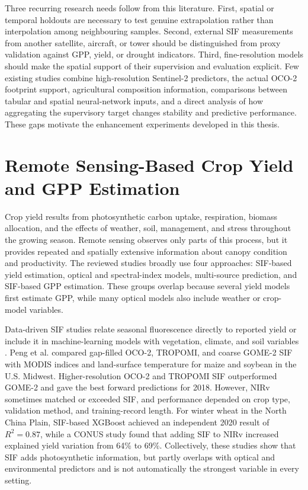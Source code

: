 Three recurring research needs follow from this literature. First, spatial or temporal holdouts are necessary to test genuine extrapolation rather than interpolation among neighbouring samples. Second, external SIF measurements from another satellite, aircraft, or tower should be distinguished from proxy validation against GPP, yield, or drought indicators. Third, fine-resolution models should make the spatial support of their supervision and evaluation explicit. Few existing studies combine high-resolution Sentinel-2 predictors, the actual OCO-2 footprint support, agricultural composition information, comparisons between tabular and spatial neural-network inputs, and a direct analysis of how aggregating the supervisory target changes stability and predictive performance. These gaps motivate the enhancement experiments developed in this thesis.

\section{Remote Sensing-Based Crop Yield and GPP Estimation}
\label{sec:crop_yield_gpp}

Crop yield results from photosynthetic carbon uptake, respiration, biomass allocation, and the effects of weather, soil, management, and stress throughout the growing season. Remote sensing observes only parts of this process, but it provides repeated and spatially extensive information about canopy condition and productivity. The reviewed studies broadly use four approaches: SIF-based yield estimation, optical and spectral-index models, multi-source prediction, and SIF-based GPP estimation. These groups overlap because several yield models first estimate GPP, while many optical models also include weather or crop-model variables.

Data-driven SIF studies relate seasonal fluorescence directly to reported yield or include it in machine-learning models with vegetation, climate, and soil variables \cite{peng2020assessing}\cite{zheng2025modeling}\cite{joshi2023winter}. Peng et al. compared gap-filled OCO-2, TROPOMI, and coarse GOME-2 SIF with MODIS indices and land-surface temperature for maize and soybean in the U.S. Midwest. Higher-resolution OCO-2 and TROPOMI SIF outperformed GOME-2 and gave the best forward predictions for 2018. However, NIRv sometimes matched or exceeded SIF, and performance depended on crop type, validation method, and training-record length. For winter wheat in the North China Plain, SIF-based XGBoost achieved an independent 2020 result of $R^2=0.87$, while a CONUS study found that adding SIF to NIRv increased explained yield variation from 64\% to 69\%. Collectively, these studies show that SIF adds photosynthetic information, but partly overlaps with optical and environmental predictors and is not automatically the strongest variable in every setting.

